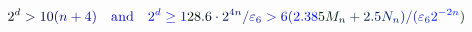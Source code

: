 \documentclass[12pt]{article}
\begin{document}
\makeatletter
\renewcommand*{\@textcolor}[3]{%
  \protect\leavevmode
  \begingroup
    \color#1{#2}#3%
  \endgroup
}
\makeatother
\begin{displaymath}
\mathcolor[RGB]{0,0,15}{2} ^ { \mathcolor[RGB]{0,0,30}{d} } \mathcolor[RGB]{0,0,45}{>} \mathcolor[RGB]{0,0,60}{1} \mathcolor[RGB]{0,0,75}{0} \mathcolor[RGB]{0,0,90}{(} \mathcolor[RGB]{0,0,105}{n} \mathcolor[RGB]{0,0,120}{+} \mathcolor[RGB]{0,0,135}{4} \mathcolor[RGB]{0,0,150}{)} \quad \mathrm { \mathcolor[RGB]{0,0,165}{a} \mathcolor[RGB]{0,0,180}{n} \mathcolor[RGB]{0,0,195}{d} } \quad \mathcolor[RGB]{0,0,210}{2} ^ { \mathcolor[RGB]{0,0,225}{d} } \mathcolor[RGB]{0,0,240}{\geq} \mathcolor[RGB]{0,0,255}{1} \mathcolor[RGB]{0,15,0}{2} \mathcolor[RGB]{0,15,15}{8} \mathcolor[RGB]{0,15,30}{.} \mathcolor[RGB]{0,15,45}{6} \mathcolor[RGB]{0,15,60}{\cdot} \mathcolor[RGB]{0,15,75}{2} ^ { \mathcolor[RGB]{0,15,90}{4} \mathcolor[RGB]{0,15,105}{n} } \mathcolor[RGB]{0,15,120}{/} \mathcolor[RGB]{0,15,135}{\varepsilon} _ { \mathcolor[RGB]{0,15,150}{6} } \mathcolor[RGB]{0,15,165}{>} \mathcolor[RGB]{0,15,180}{6} \mathcolor[RGB]{0,15,195}{(} \mathcolor[RGB]{0,15,210}{2} \mathcolor[RGB]{0,15,225}{.} \mathcolor[RGB]{0,15,240}{3} \mathcolor[RGB]{0,15,255}{8} \mathcolor[RGB]{0,30,0}{5} \mathcolor[RGB]{0,30,15}{M} _ { \mathcolor[RGB]{0,30,30}{n} } \mathcolor[RGB]{0,30,45}{+} \mathcolor[RGB]{0,30,60}{2} \mathcolor[RGB]{0,30,75}{.} \mathcolor[RGB]{0,30,90}{5} \mathcolor[RGB]{0,30,105}{N} _ { \mathcolor[RGB]{0,30,120}{n} } \mathcolor[RGB]{0,30,135}{)} \mathcolor[RGB]{0,30,150}{/} \mathcolor[RGB]{0,30,165}{(} \mathcolor[RGB]{0,30,180}{\varepsilon} _ { \mathcolor[RGB]{0,30,195}{6} } \mathcolor[RGB]{0,30,210}{2} ^ { \mathcolor[RGB]{0,30,225}{-} \mathcolor[RGB]{0,30,240}{2} \mathcolor[RGB]{0,30,255}{n} } \mathcolor[RGB]{0,45,0}{)}
\end{displaymath}
\end{document}
